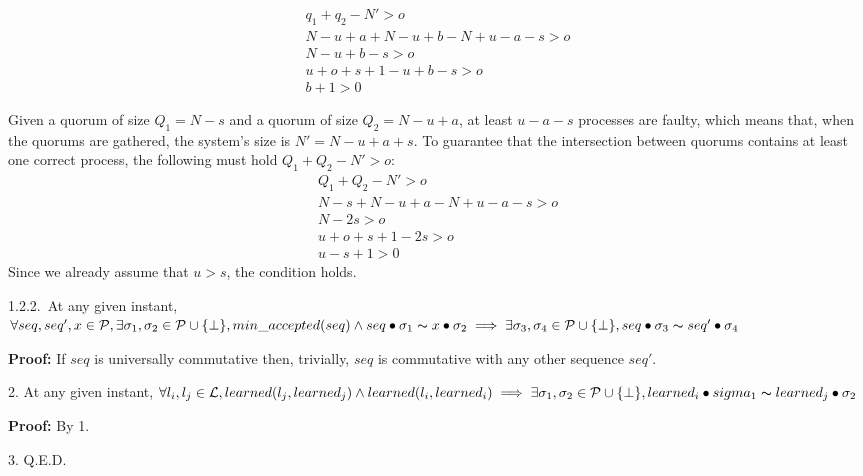 \indent\indent\indent\indent\indent\indent\parbox{\linewidth-\algorithmicindent*6}{
\begin{align*}
	q_1+q_2-N'>o \\
	N-u+a+N-u+b-N+u-a-s>o \\
	N-u+b-s>o \\
	u+o+s+1-u+b-s>o\\
	b+1>0
\end{align*}}
\indent\indent\indent\indent\indent\indent\parbox{\linewidth-\algorithmicindent*6}{
Given a quorum of size $Q_1=N-s$ and a quorum of size $Q_2=N-u+a$, at least $u-a-s$ processes are faulty, which means that, when the quorums are gathered, the system's size is $N'=N-u+a+s$. To guarantee that the intersection between quorums contains at least one correct process, the following must hold $Q_1+Q_2-N'>o$: 
\begin{align*}
	Q_1+Q_2-N'>o \\
	N-s+N-u+a-N+u-a-s>o\\
	N-2s>o\\
	u+o+s+1-2s>o\\
	u-s+1>0
\end{align*}
Since we already assume that $u>s$, the condition holds.}
\indent\indent\indent\indent\indent\parbox{\linewidth-\algorithmicindent*5}{\strut1.2.2.~At any given instant, $\forall seq,seq',x \in \mathcal{P},\exists \sigma_1,\sigma_2 \in \mathcal{P} \cup \{\bot\}, min\_accepted(seq) \land seq \bullet \sigma_1 \thicksim x \bullet \sigma_2  \implies \exists \sigma_3,\sigma_4 \in \mathcal{P} \cup \{\bot\}, seq \bullet \sigma_3 \thicksim seq' \bullet \sigma_4$} \par
\indent\indent\indent\indent\indent\indent\parbox{\linewidth-\algorithmicindent*6}{\strut\textbf{Proof:} If $seq$ is universally commutative then, trivially, $seq$ is commutative with any other sequence $seq'$.}
\indent\parbox{\linewidth-\algorithmicindent}{\strut2. At any given instant, $\forall l_i,l_j \in \mathcal{L}, learned(l_j,learned_j) \land learned(l_i,learned_i) \implies \exists \sigma_1,\sigma_2 \in \mathcal{P} \cup \{\bot\}, learned_i \bullet sigma_1 \thicksim learned_j \bullet \sigma_2$}\par
\indent\indent\parbox{\linewidth}{\strut\textbf{Proof:} By 1.}\par
\indent\parbox{\linewidth-\algorithmicindent}{\strut3. Q.E.D.} \par

